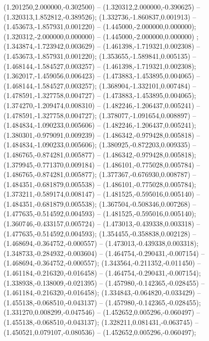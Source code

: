  (1.201250,2.000000,-0.302500) -- (1.320312,2.000000,-0.390625) -- (1.320313,1.852812,-0.389526);
 (1.332736,-1.860837,0.001913) -- (1.453673,-1.857931,0.001220) -- (1.445000,-2.000000,0.000000);
 (1.320312,-2.000000,0.000000) -- (1.445000,-2.000000,0.000000) ;
 (1.343874,-1.723942,0.003629) -- (1.461398,-1.719321,0.002308) -- (1.453673,-1.857931,0.001220);
 (1.353655,-1.589841,0.005135) -- (1.468144,-1.584527,0.003257) -- (1.461398,-1.719321,0.002308);
 (1.362017,-1.459056,0.006423) -- (1.473883,-1.453895,0.004065) -- (1.468144,-1.584527,0.003257);
 (1.368904,-1.332101,0.007484) -- (1.478591,-1.327758,0.004727) -- (1.473883,-1.453895,0.004065);
 (1.374270,-1.209474,0.008310) -- (1.482246,-1.206437,0.005241) -- (1.478591,-1.327758,0.004727);
 (1.378077,-1.091654,0.008897) -- (1.484834,-1.090233,0.005606) -- (1.482246,-1.206437,0.005241);
 (1.380301,-0.979091,0.009239) -- (1.486342,-0.979428,0.005818) -- (1.484834,-1.090233,0.005606);
 (1.380925,-0.872203,0.009335) -- (1.486765,-0.874281,0.005877) -- (1.486342,-0.979428,0.005818);
 (1.379945,-0.771370,0.009184) -- (1.486101,-0.775028,0.005784) -- (1.486765,-0.874281,0.005877);
 (1.377367,-0.676930,0.008787) -- (1.484351,-0.681879,0.005538) -- (1.486101,-0.775028,0.005784);
 (1.373211,-0.589174,0.008147) -- (1.481525,-0.595016,0.005140) -- (1.484351,-0.681879,0.005538);
 (1.367504,-0.508346,0.007268) -- (1.477635,-0.514592,0.004593) -- (1.481525,-0.595016,0.005140);
 (1.360746,-0.433157,0.005724) -- (1.473013,-0.439338,0.003318) -- (1.477635,-0.514592,0.004593);
 (1.354455,-0.358838,0.002128) -- (1.468694,-0.364752,-0.000557) -- (1.473013,-0.439338,0.003318);
 (1.348733,-0.284932,-0.003604) -- (1.464754,-0.290431,-0.007154) -- (1.468694,-0.364752,-0.000557);
 (1.343564,-0.211352,-0.011450) -- (1.461184,-0.216320,-0.016458) -- (1.464754,-0.290431,-0.007154);
 (1.338938,-0.138009,-0.021395) -- (1.457980,-0.142365,-0.028455) -- (1.461184,-0.216320,-0.016458);
 (1.334843,-0.064820,-0.033429) -- (1.455138,-0.068510,-0.043137) -- (1.457980,-0.142365,-0.028455);
 (1.331270,0.008299,-0.047546) -- (1.452652,0.005296,-0.060497) -- (1.455138,-0.068510,-0.043137);
 (1.328211,0.081431,-0.063745) -- (1.450521,0.079107,-0.080536) -- (1.452652,0.005296,-0.060497);
